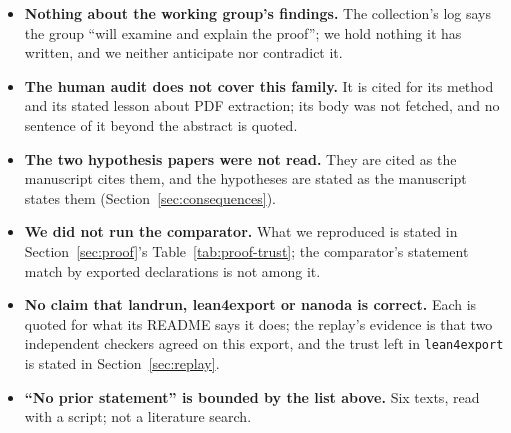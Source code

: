 \begin{itemize}
\item \textbf{Nothing about the working group's findings.} The
  collection's log says the group ``will examine and explain the
  proof''; we hold nothing it has written, and we neither anticipate
  nor contradict it.
\item \textbf{The human audit does not cover this family.} It is cited
  for its method and its stated lesson about PDF extraction; its body
  was not fetched, and no sentence of it beyond the abstract is quoted.
\item \textbf{The two hypothesis papers were not read.} They are cited
  as the manuscript cites them, and the hypotheses are stated as the
  manuscript states them (Section~\ref{sec:consequences}).
\item \textbf{We did not run the comparator.} What we reproduced is
  stated in Section~\ref{sec:proof}'s Table~\ref{tab:proof-trust};
  the comparator's statement match by exported declarations is not among
  it.
\item \textbf{No claim that landrun, lean4export or nanoda is correct.}
  Each is quoted for what its README says it does; the replay's
  evidence is that two independent checkers agreed on this export, and
  the trust left in \texttt{lean4export} is stated in
  Section~\ref{sec:replay}.
\item \textbf{``No prior statement'' is bounded by the list above.} Six
  texts, read with a script; not a literature search.
\end{itemize}
\endgroup

